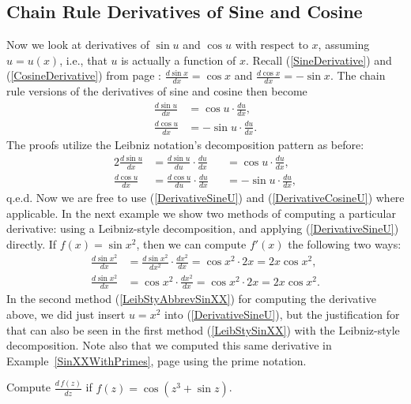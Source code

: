 \subsection{Chain Rule Derivatives of Sine and Cosine}
Now we look at derivatives of $\sin u$ and $\cos u$ with 
respect to $x$, assuming $u=u(x)$, i.e., that $u$ is actually
a function of $x$.  Recall (\ref{SineDerivative}) and
(\ref{CosineDerivative}) from page \pageref{SineDerivative}:
$\frac{d\sin x}{dx}=\cos x$ and $\frac{d\cos x}{dx}=-\sin x$.
The chain rule versions of the 
derivatives of sine and cosine then become
\begin{align}
\frac{d\sin u}{dx}&=\cos u\cdot\frac{du}{dx},\label{DerivativeSineU}\\
\frac{d\cos u}{dx}&=-\sin u\cdot\frac{du}{dx}.\label{DerivativeCosineU}
\end{align}
The proofs utilize the Leibniz notation's decomposition pattern as before:
\begin{alignat*}{2}
\frac{d\sin u}{dx}&=\frac{d\sin u}{du}\cdot\frac{du}{dx}&&=
                                     \cos u\cdot\frac{du}{dx},\\
\frac{d\cos u}{dx}&=\frac{d\cos u}{du}\cdot\frac{du}{dx}&&=
                                     -\sin u\cdot\frac{du}{dx},
\end{alignat*}
q.e.d.  Now we are free to use (\ref{DerivativeSineU})
and (\ref{DerivativeCosineU}) where applicable.
In the next example we show two methods of computing a particular
derivative: using a Leibniz-style decomposition, and 
applying (\ref{DerivativeSineU}) directly.
\bex If $f(x)=\sin x^2$, then we can compute $f'(x)$ the following
two ways:
\begin{align}
\frac{d\sin x^2}{dx}&=\frac{d\sin x^2}{dx^2}\cdot\frac{dx^2}{dx}
                     =\cos x^2\cdot 2x=2x\cos x^2,\label{LeibStySinXX}\\
\frac{d\sin x^2}{dx}&=\cos x^2\cdot\frac{dx^2}{dx}=\cos x^2\cdot2x=
                       2x\cos x^2.\label{LeibStyAbbrevSinXX}\end{align}
\eex
In the second method (\ref{LeibStyAbbrevSinXX}) 
for computing the derivative above,
we did just insert $u=x^2$ into (\ref{DerivativeSineU}),
but the justification for that can also be seen in the first 
method (\ref{LeibStySinXX})  with the Leibniz-style decomposition.
Note also that we computed this same derivative in
Example~\ref{SinXXWithPrimes}, page \pageref{SinXXWithPrimes}
using the prime notation.

\bex Compute $\frac{d\,f(z)}{dz}$ if $f(z)=\cos(z^3+\sin z)$.

